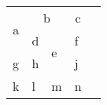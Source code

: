 \documentclass{article}
\begin{document}



\begin{tabular}{|l|ll|l|l}
\cline{1-4}
\multicolumn{1}{|c|}{\multirow{2}{*}{a}} & \multicolumn{2}{c|}{b}                      & \multicolumn{1}{c|}{c} &  \\ \cline{2-4}
\multicolumn{1}{|c|}{}                   & \multicolumn{1}{l|}{d} & \multirow{2}{*}{e} & f                      &  \\ \cline{1-2} \cline{4-4}
g                                        & \multicolumn{1}{l|}{h} &                    & j                      &  \\ \cline{1-4}
k                                        & \multicolumn{1}{l|}{l} & m                  & n                      &  \\ \cline{1-4}
\end{tabular}









\newpage


\makeatletter
\g@addto@macro{\table[ht]}{\fontsize{9pt}{10.8pt}\selectfont}
\makeatother
\end{document}
